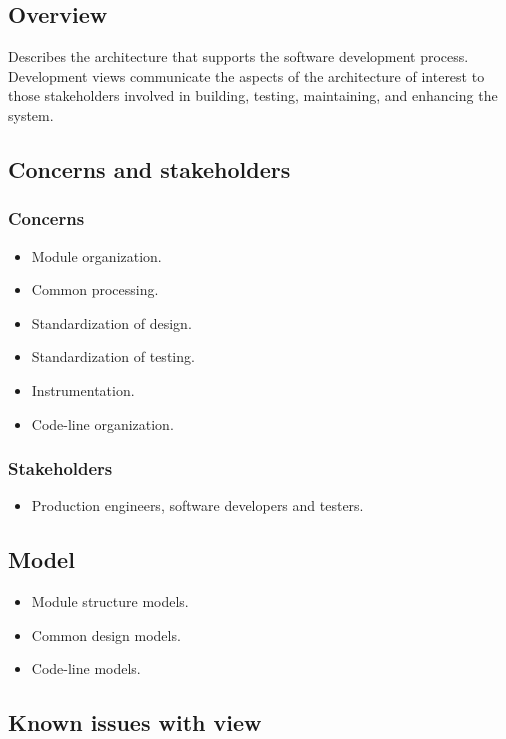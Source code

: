 \subsection{Overview}

Describes the architecture that supports the software development process. Development views communicate the aspects of the architecture of interest to those stakeholders involved in building, testing, maintaining, and enhancing the system.

\subsection{Concerns and stakeholders}

\subsubsection{Concerns}

\begin{itemize}
\item Module organization.
\item Common processing.
\item Standardization of design.
\item Standardization of testing.
\item Instrumentation.
\item Code-line organization.
\end{itemize}

\subsubsection{Stakeholders}

\begin{itemize}
\item Production engineers, software developers and testers.
\end{itemize}

\subsection{Model}

\begin{itemize}
\item Module structure models.
\item Common design models.
\item Code-line models.
\end{itemize}

\subsection{Known issues with view}

